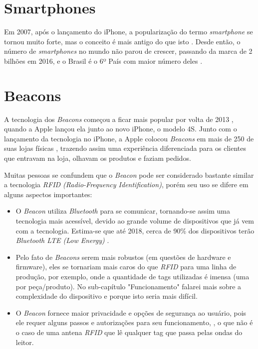 \documentclass[
	12pt,
	oneside,
	a4paper,
	english,
	brazil,
]{abntex2}
\begin{document}
\section{Smartphones}

Em 2007, após o lançamento do iPhone, a popularização do termo \emph{smartphone} se tornou muito forte, mas o conceito é mais antigo do que isto \cite{smartphone-history-pictures}. Desde então, o número de \emph{smartphones} no mundo não parou de crescer, passando da marca de 2 bilhões em 2016, e o Brasil é o 6º País com maior número deles \cite{smartphone-numbers}.

\section{Beacons}

A tecnologia dos \emph{Beacons} começou a ficar mais popular por volta de 2013 \cite{beacon-what-is-it-forbes}, quando a Apple lançou ela junto ao novo iPhone, o modelo 4S. Junto com o lançamento da tecnologia no iPhone, a Apple colocou \emph{Beacons} em mais de 250 de suas lojas físicas \cite{beacon-apple-store-case}, trazendo assim uma experiência diferenciada para os clientes que entravam na loja, olhavam os produtos e faziam pedidos.

Muitas pessoas se confundem que o \emph{Beacon} pode ser considerado bastante similar a tecnologia \emph{RFID (Radio-Frequency Identification)}, porém seu uso se difere em alguns aspectos importantes:

\begin{itemize}
    \item O \emph{Beacon} utiliza \emph{Bluetooth} para se comunicar, tornando-se assim uma tecnologia mais acessível, devido ao grande volume de dispositivos que já vem com a tecnologia. Estima-se que até 2018, cerca de 90\% dos dispositivos terão \emph{Bluetooth LTE (Low Energy)} \cite{beacon-devices-estimate-2018}.
    \item Pelo fato de \emph{Beacons} serem mais robustos (em questões de hardware e firmware), eles se tornariam mais caros do que \emph{RFID} para uma linha de produção, por exemplo, onde a quantidade de tags utilizadas é imensa (uma por peça/produto). No sub-capítulo "Funcionamento" falarei mais sobre a complexidade do dispositivo e porque isto seria mais difícil.
    \item O \emph{Beacon} fornece maior privacidade e opções de segurança ao usuário, pois ele requer alguns passos e autorizações para seu funcionamento, \cite{beacon-apple-store-case}, o que não é o caso de uma antena \emph{RFID} que lê qualquer tag que passa pelas ondas do leitor.
\end{itemize}
\end{document}
